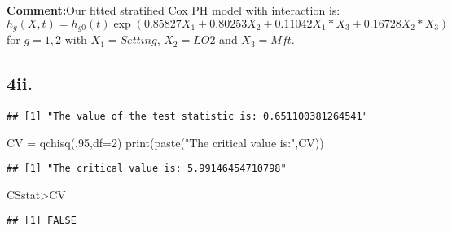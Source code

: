 \documentclass[
]{article}
\newenvironment{Shaded}{\begin{snugshade}}{\end{snugshade}}
\newcommand{\AttributeTok}[1]{\textcolor[rgb]{0.77,0.63,0.00}{#1}}
\newcommand{\DecValTok}[1]{\textcolor[rgb]{0.00,0.00,0.81}{#1}}
\newcommand{\FunctionTok}[1]{\textcolor[rgb]{0.00,0.00,0.00}{#1}}
\newcommand{\NormalTok}[1]{#1}
\newcommand{\OtherTok}[1]{\textcolor[rgb]{0.56,0.35,0.01}{#1}}
\newcommand{\SpecialCharTok}[1]{\textcolor[rgb]{0.00,0.00,0.00}{#1}}
\newcommand{\StringTok}[1]{\textcolor[rgb]{0.31,0.60,0.02}{#1}}
\begin{document}
\textbf{Comment:}Our fitted stratified Cox PH model with interaction is:
\[
h_g(X,t)=h_{g0}(t)\exp(0.85827X_1+0.80253X_2 + 0.11042X_1*X_3 +0.16728X_2*X_3)
\] for \(g=1,2\) with \(X_1=Setting\), \(X_2=LO2\) and \(X_3=Mft\).

\hypertarget{ii.}{%
\subsection{4ii.}\label{ii.}}

\begin{Shaded}
\end{Shaded}

\begin{verbatim}
## [1] "The value of the test statistic is: 0.651100381264541"
\end{verbatim}

\begin{Shaded}
\begin{Highlighting}[]
\NormalTok{CV }\OtherTok{=} \FunctionTok{qchisq}\NormalTok{(.}\DecValTok{95}\NormalTok{,}\AttributeTok{df=}\DecValTok{2}\NormalTok{)}
\FunctionTok{print}\NormalTok{(}\FunctionTok{paste}\NormalTok{(}\StringTok{"The critical value is:"}\NormalTok{,CV))}
\end{Highlighting}
\end{Shaded}

\begin{verbatim}
## [1] "The critical value is: 5.99146454710798"
\end{verbatim}

\begin{Shaded}
\begin{Highlighting}[]
\NormalTok{CSstat}\SpecialCharTok{\textgreater{}}\NormalTok{CV}
\end{Highlighting}
\end{Shaded}

\begin{verbatim}
## [1] FALSE
\end{verbatim}
\end{document}
